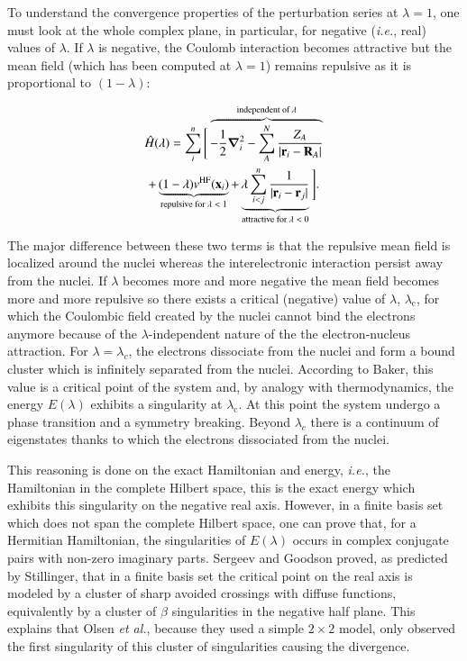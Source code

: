 \documentclass[aps,prb,reprint,noshowkeys,superscriptaddress]{revtex4-1}
\newcommand{\ie}{\textit{i.e.}}
\newcommand{\hH}{\Hat{H}}
\begin{document}
To understand the convergence properties of the perturbation series at $\lambda=1$, one must look at the whole complex plane, in particular, for negative (\ie, real) values of $\lambda$. If $\lambda$ is negative, the Coulomb interaction becomes attractive but the mean field (which has been computed at $\lambda = 1$) remains repulsive as it is proportional to $(1-\lambda)$:

\begin{multline}
\label{eq:HamiltonianStillinger}
    \hH(\lambda) = 
    \sum_{i}^{n} \Bigg[ 
    \overbrace{-\frac{1}{2}\grad_i^2 
    - \sum_{A}^{N} \frac{Z_A}{\abs{\vb{r}_i-\vb{R}_A}}}^{\text{independent of $\lambda$}}
    \\
    + \underbrace{(1-\lambda)v^{\text{HF}}(\vb{x}_i)}_{\text{repulsive for $\lambda < 1$}}
    + \underbrace{\lambda\sum_{i<j}^{n}\frac{1}{|\vb{r}_i-\vb{r}_j|}}_{\text{attractive for $\lambda < 0$}}
    \Bigg].
\end{multline}

The major difference between these two terms is that the repulsive mean field is localized around the nuclei whereas the interelectronic interaction persist away from the nuclei. If $\lambda$ becomes more and more negative the mean field becomes more and more repulsive so there exists a critical (negative) value of $\lambda$, $\lambda_\text{c}$, for which the Coulombic field created by the nuclei cannot bind the electrons anymore because of the $\lambda$-independent nature of the the electron-nucleus attraction. For $\lambda = \lambda_c$, the electrons dissociate from the nuclei and form a bound cluster which is infinitely separated from the nuclei. According to Baker, \cite{Baker_1971} this value is a critical point of the system and, by analogy with thermodynamics, the energy $E(\lambda)$ exhibits a singularity at $\lambda_\text{c}$. At this point the system undergo a phase transition and a symmetry breaking. 
Beyond $\lambda_c$ there is a continuum of eigenstates thanks to which the electrons dissociated from the nuclei.

This reasoning is done on the exact Hamiltonian and energy, \ie, the Hamiltonian in the complete Hilbert space, this is the exact energy which exhibits this singularity on the negative real axis. However, in a finite basis set which does not span the complete Hilbert space, one can prove that, for a Hermitian Hamiltonian, the singularities of $E(\lambda)$ occurs in complex conjugate pairs with non-zero imaginary parts. Sergeev and Goodson proved, \cite{Sergeev_2005} as predicted by Stillinger, \cite{Stillinger_2000} that in a finite basis set the critical point on the real axis is modeled by a cluster of sharp avoided crossings with diffuse functions, equivalently by a cluster of $\beta$ singularities in the negative half plane. This explains that Olsen \textit{et al.}, because they used a simple $2\times2$ model, only observed the first singularity of this cluster of singularities causing the divergence. \cite{Olsen_2000}
\end{document}
